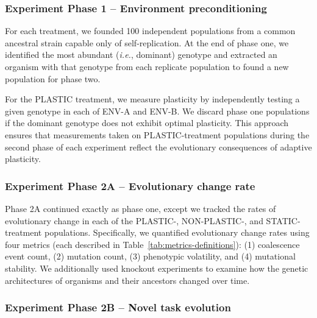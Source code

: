 \vspace{5mm}
\subsubsection{Experiment Phase 1 -- Environment preconditioning}
\label{sec:methods:experiment:phase-one}

For each treatment, we founded 100 independent populations from a common ancestral strain capable only of self-replication.
At the end of phase one, we identified the most abundant (\textit{i.e.}, dominant) genotype and extracted an organism with that genotype from each replicate population to found a new population for phase two.

For the PLASTIC treatment, we measure plasticity by independently testing a given genotype in each of ENV-A and ENV-B.
We discard phase one populations if the dominant genotype does not exhibit optimal plasticity.
This approach ensures that measurements taken on PLASTIC-treatment populations during the second phase of each experiment reflect the evolutionary consequences of adaptive plasticity.

\vspace{5mm}
\subsubsection{Experiment Phase 2A -- Evolutionary change rate}
\label{sec:methods:exp:evolutionary-change-rate}

Phase 2A continued exactly as phase one, except we tracked the rates of evolutionary change in each of the PLASTIC-, NON-PLASTIC-, and STATIC-treatment populations. 
Specifically, we quantified evolutionary change rates using four metrics (each described in Table~\ref{tab:metrics-definitions}):
(1) coalescence event count,
(2) mutation count, 
(3) phenotypic volatility,
and (4) mutational stability.
We additionally used knockout experiments to examine how the genetic architectures of organisms and their ancestors changed over time.

\vspace{3mm}
\subsubsection{Experiment Phase 2B -- Novel task evolution}
\label{sec:methods:exp:novel-task-evolution}

